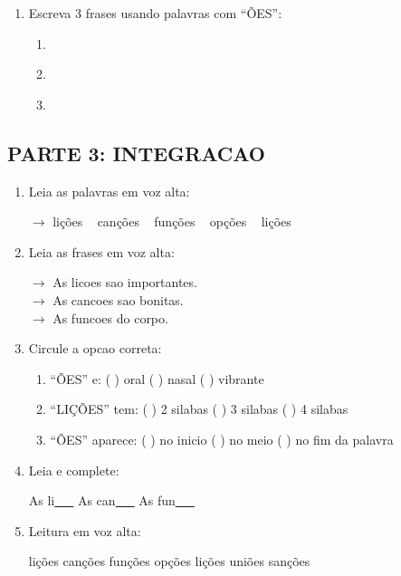 \begin{exercicio}
\begin{enumerate}[resume]
  \item Escreva 3 frases usando palavras com ``ÕES'':
  \begin{enumerate}[label=\alph*)]
    \item \underline{\hspace{8cm}}
    \item \underline{\hspace{8cm}}
    \item \underline{\hspace{8cm}}
  \end{enumerate}
\end{enumerate}

\subsection*{PARTE 3: INTEGRACAO}

\begin{enumerate}[resume]
  \item Leia as palavras em voz alta:
  \begin{center}
  $\rightarrow$ lições  ~  canções  ~  funções  ~  opções  ~  lições
  \end{center}

  \item Leia as frases em voz alta:
  \begin{center}
  $\rightarrow$ As licoes sao importantes.\\
  $\rightarrow$ As cancoes sao bonitas.\\
  $\rightarrow$ As funcoes do corpo.
  \end{center}

  \item Circule a opcao correta:
  \begin{enumerate}[label=(\alph*)]
    \item ``ÕES'' e: ( ) oral ( ) nasal ( ) vibrante
    \item ``LIÇÕES'' tem: ( ) 2 silabas ( ) 3 silabas ( ) 4 silabas
    \item ``ÕES'' aparece: ( ) no inicio ( ) no meio ( ) no fim da palavra
  \end{enumerate}

  \item Leia e complete:
  \begin{center}
  As li\underline{~~~} \quad As can\underline{~~~} \quad As fun\underline{~~~}
  \end{center}

  \item Leitura em voz alta:
  \begin{center}
lições \quad canções \quad funções \quad opções \quad lições \quad uniões \quad sanções
\end{center}
\end{enumerate}
\end{exercicio}

